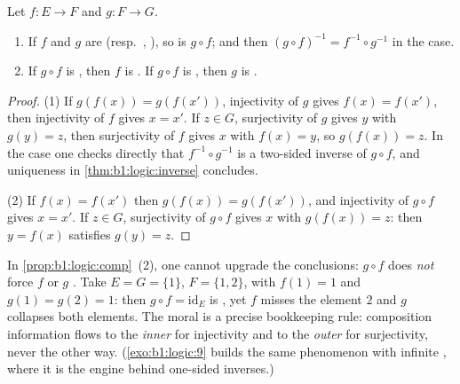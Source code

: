 \begin{proposition}\label{prop:b1:logic:comp}
Let $f \colon E \to F$ and $g \colon F \to G$.
\begin{enumerate}
  \item If $f$ and $g$ are  (resp.\ , ), so
        is $g \circ f$; and then $(g \circ f)^{-1} = f^{-1} \circ
        g^{-1}$ in the  case.
  \item If $g \circ f$ is , then $f$ is . If
        $g \circ f$ is , then $g$ is .
\end{enumerate}
\end{proposition}

\begin{proof}
(1) If $g(f(x)) = g(f(x'))$, injectivity of $g$ gives $f(x) = f(x')$,
then injectivity of $f$ gives $x = x'$. If $z \in G$, surjectivity of
$g$ gives $y$ with $g(y) = z$, then surjectivity of $f$ gives $x$ with
$f(x) = y$, so $g(f(x)) = z$. In the  case one checks directly
that $f^{-1} \circ g^{-1}$ is a two-sided inverse of $g \circ f$, and
uniqueness in \cref{thm:b1:logic:inverse} concludes.

(2) If $f(x) = f(x')$ then $g(f(x)) = g(f(x'))$, and injectivity of
$g \circ f$ gives $x = x'$. If $z \in G$, surjectivity of $g \circ f$
gives $x$ with $g(f(x)) = z$: then $y = f(x)$ satisfies $g(y) = z$.
\end{proof}

\begin{example}\label{ex:b1:logic:compsharp}
In \cref{prop:b1:logic:comp}~(2), one cannot upgrade the
conclusions: $g \circ f$  does \emph{not} force $f$
 or $g$ . Take $E = G = \{1\}$, $F = \{1,
2\}$, with $f(1) = 1$ and $g(1) = g(2) = 1$: then $g \circ f =
\mathrm{id}_E$ is , yet $f$ misses the element $2$ and
$g$ collapses both elements. The moral is a precise bookkeeping
rule: composition information flows to the \emph{inner}  for
injectivity and to the \emph{outer}  for surjectivity, never
the other way. (\cref{exo:b1:logic:9} builds the same phenomenon
with infinite , where it is the engine behind one-sided
inverses.)
\end{example}

